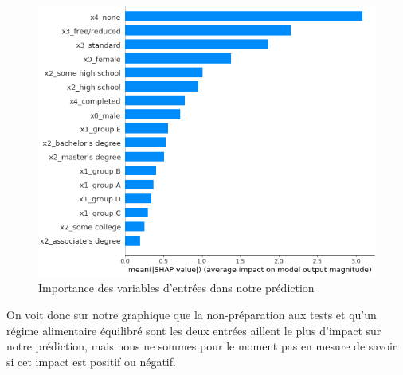\begin{figure}[h]
    \includegraphics[scale=0.6]{src_img/shapPlotBar.png}
    \caption{Importance des variables d'entrées dans notre prédiction}
    \label{shapPlotBar}
\end{figure}

On voit donc sur notre graphique que la non-préparation aux tests et qu'un régime alimentaire équilibré sont les deux entrées aillent le plus d'impact sur notre prédiction, mais nous ne sommes pour le moment pas en mesure de savoir si cet impact est positif ou négatif.


